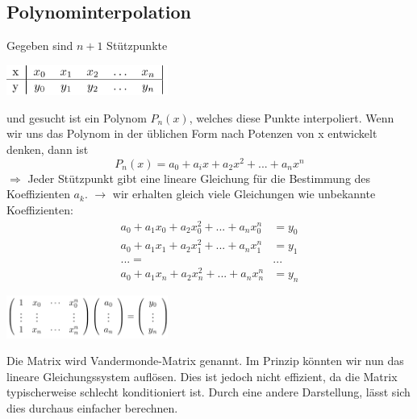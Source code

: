 \documentclass{article}
\newenvironment{Figure}
	{\par\medskip\noindent\minipage{\linewidth}}
	{\endminipage\par\medskip}
\theoremstyle{satz}
\theoremstyle{definition}
\begin{document}
\subsection{Polynominterpolation}
Gegeben sind $n+1$ Stützpunkte
\begin{Figure}
\centering
\includegraphics[width=200px]{img/Stuetzpunkte.png}
	\label{fig:gegebene Stützpunkte}
\end{Figure}
und gesucht ist ein Polynom $P_n(x)$, welches diese Punkte interpoliert. Wenn wir uns das Polynom in der üblichen Form nach Potenzen von x entwickelt denken, dann ist
\begin{equation}
	P_n(x) = a_0 + a_ix  + a_2x^2 + ... + a_nx^n
\end{equation} 
$\Rightarrow$ Jeder Stützpunkt gibt eine lineare Gleichung für die Bestimmung des Koeffizienten $a_k$. $\rightarrow$ wir erhalten gleich viele Gleichungen wie unbekannte Koeffizienten:
\begin{equation}
\begin{split}
	a_0 + a_1x_0 + a_2x_0^2 + ... + a_nx_0^n &= y_0\\
	a_0 + a_1x_1 + a_2x_1^2 + ... + a_nx_1^n &= y_1\\
	... =& ...\\
	a_0 + a_1x_n + a_2x_n^2 + ... + a_nx_n^n &= y_n
\end{split}
\end{equation}

\begin{Figure}
\centering
\includegraphics[width=200px]{img/InterpolationMatrix.png}
	\label{fig:Vandermonde-Matrix}
\end{Figure}
Die Matrix wird Vandermonde-Matrix genannt. Im Prinzip könnten wir nun das lineare Gleichungssystem auflösen. Dies ist jedoch nicht effizient, da die Matrix typischerweise schlecht konditioniert ist. Durch eine andere Darstellung, lässt sich dies durchaus einfacher berechnen.
\end{document}
